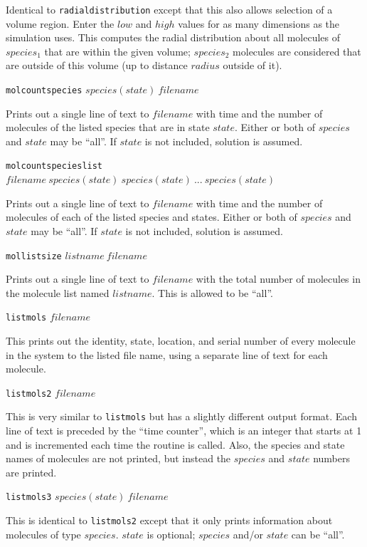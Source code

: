 \documentclass {book}
\newcommand {\ttt} {\texttt}
\begin{document}
\begin{description}
Identical to \ttt{radialdistribution} except that this also allows selection of a volume region. Enter the $low$ and $high$ values for as many dimensions as the simulation uses. This computes the radial distribution about all molecules of $species_1$ that are within the given volume; $species_2$ molecules are considered that are outside of this volume (up to distance $radius$ outside of it).

\item{\ttt{molcountspecies} $species(state)\ filename$}

Prints out a single line of text to $filename$ with time and the number of molecules of the listed species that are in state $state$. Either or both of $species$ and $state$ may be ``all''. If $state$ is not included, solution is assumed.

\item{\ttt{molcountspecieslist} $filename\ species(state)\ species(state)\ ...\ species(state)$}

Prints out a single line of text to $filename$ with time and the number of molecules of each of the listed species and states. Either or both of $species$ and $state$ may be ``all''. If $state$ is not included, solution is assumed.

\item{\ttt{mollistsize} $listname\ filename$}

Prints out a single line of text to $filename$ with the total number of molecules in the molecule list named $listname$. This is allowed to be ``all''.

\item{\ttt{listmols} $filename$}

This prints out the identity, state, location, and serial number of every molecule in the system to the listed file name, using a separate line of text for each molecule.

\item{\ttt{listmols2} $filename$}

This is very similar to \ttt{listmols} but has a slightly different output format. Each line of text is preceded by the ``time counter'', which is an integer that starts at 1 and is incremented each time the routine is called. Also, the species and state names of molecules are not printed, but instead the $species$ and $state$ numbers are printed.

\item{\ttt{listmols3} $species(state)\ filename$}

This is identical to \ttt{listmols2} except that it only prints information about molecules of type $species$. $state$ is optional; $species$ and/or $state$ can be ``all''.


\end{description}
\end{document}

